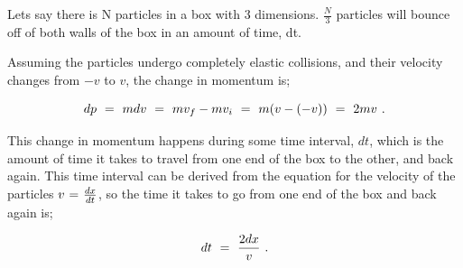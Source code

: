 \documentclass{article}
\begin{document}
\vspace{0.25cm}

Lets say there is N particles in a box with 3 dimensions. \begin{math} \frac{N}{3} \end{math} particles will bounce off of both walls of the box in an amount of time, dt. 

\vspace{0.25cm}

Assuming the particles undergo completely elastic collisions, and their velocity changes from \begin{math} -v \end{math} to \begin{math} v \end{math}, the change in momentum is;

\vspace{-0.25cm}

\begin{equation} \label{eq:256}
dp \hspace{0.125cm} = \hspace{0.125cm} m dv \hspace{0.125cm} = \hspace{0.125cm} m v_f - m v_i \hspace{0.125cm} = \hspace{0.125cm} m (v - (-v)) \hspace{0.125cm} = \hspace{0.125cm} 2 m v \hspace{0.125cm} .
\end{equation}

This change in momentum happens during some time interval, \begin{math} dt \end{math}, which is the amount of time it takes to travel from one end of the box to the other, and back again. This time interval can be derived from the equation for the velocity of the particles \begin{math} v \hspace{0.025cm} = \hspace{0.025cm} \frac{d x}{d t} \end{math}, so the time it takes to go from one end of the box and back again is;

\begin{equation} \label{eq:256}
dt \hspace{0.125cm} = \hspace{0.125cm} \frac{2 d x}{v} \hspace{0.125cm} .
\end{equation}
\end{document}

